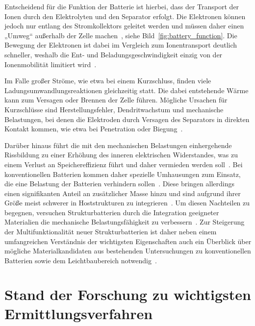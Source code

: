 Entscheidend für die Funktion der Batterie ist hierbei, dass der Transport der Ionen durch den Elektrolyten und den Separator erfolgt. Die Elektronen können jedoch nur entlang des Stromkollektors geleitet werden und müssen daher einen „Umweg“ außerhalb der Zelle machen~\cite{Plett2015}, siehe Bild~\ref{fig:battery_function}. Die Bewegung der Elektronen ist dabei im Vergleich zum Ionentransport deutlich schneller, weshalb die Ent- und Beladungsgeschwindigkeit einzig von der Ionenmobilität limitiert wird~\cite{Plett2024}.

Im Falle großer Ströme, wie etwa bei einem Kurzschluss, finden viele Ladungsumwandlungsreaktionen gleichzeitig statt. Die dabei entstehende Wärme kann zum Versagen oder Brennen der Zelle führen. Mögliche Ursachen für Kurzschlüsse sind Herstellungsfehler, Dendritwachstum und mechanische Belastungen, bei denen die Elektroden durch Versagen des Separators in direkten Kontakt kommen, wie etwa bei Penetration oder Biegung~\cite{Beard2019}.

Darüber hinaus führt die mit den mechanischen Belastungen einhergehende Rissbildung zu einer Erhöhung des inneren elektrischen Widerstandes, was zu einem Verlust an Speichereffizienz führt und daher vermieden werden soll~\cite{Plett2024}. Bei konventionellen Batterien kommen daher spezielle Umhausungen zum Einsatz, die eine Belastung der Batterien verhindern sollen~\cite{Beard2019}. Diese bringen allerdings einen signifikanten Anteil an zusätzlicher Masse hinzu und sind aufgrund ihrer Größe meist schwerer in Hoststrukturen zu integrieren~\cite{Asp2021}. Um diesen Nachteilen zu begegnen, versuchen Strukturbatterien durch die Integration geeigneter Materialien die mechanische Belastungsfähigkeit zu verbessern~\cite{Carlstedt2018}. Zur Steigerung der Multifunktionalität neuer Strukturbatterien ist daher neben einem umfangreichen Verständnis der wichtigsten Eigenschaften auch ein Überblick über mögliche Materialkandidaten aus bestehenden Untersuchungen zu konventionellen Batterien sowie dem Leichtbaubereich notwendig~\cite{Asp2019}.


\section{Stand der Forschung zu wichtigsten Ermittlungsverfahren}

